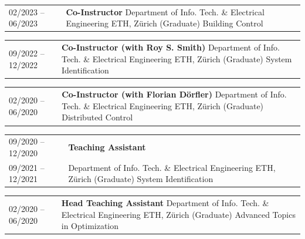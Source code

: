 \begin{tabular}{p{} p{}}
  02/2023 -- 06/2023 & \textbf{Co-Instructor} \newline
                       Department of Info. Tech. \& Electrical Engineering \newline
                       ETH, Z\"{u}rich \newline
                       (Graduate) Building Control
\end{tabular}
\begin{tabular}{p{} p{}}
  09/2022 -- 12/2022 & \textbf{Co-Instructor (with Roy S. Smith)} \newline
                       Department of Info. Tech. \& Electrical Engineering \newline
                       ETH, Z\"{u}rich \newline
                       (Graduate) System Identification
\end{tabular}
\begin{tabular}{p{} p{}}
  02/2020 -- 06/2020 & \textbf{Co-Instructor (with Florian D\"{o}rfler)} \newline
                       Department of Info. Tech. \& Electrical Engineering \newline
                       ETH, Z\"{u}rich \newline
                       (Graduate) Distributed Control
\end{tabular}
\begin{tabular}{p{} p{}}
  09/2020 -- 12/2020 & \textbf{Teaching Assistant} \\
  09/2021 -- 12/2021 & Department of Info. Tech. \& Electrical Engineering \newline
                       ETH, Z\"{u}rich \newline
                       (Graduate) System Identification
\end{tabular}
\begin{tabular}{p{} p{}}
  02/2020 -- 06/2020 & \textbf{Head Teaching Assistant} \newline
                       Department of Info. Tech. \& Electrical Engineering \newline
                       ETH, Z\"{u}rich \newline
                       (Graduate) Advanced Topics in Optimization
\end{tabular}
